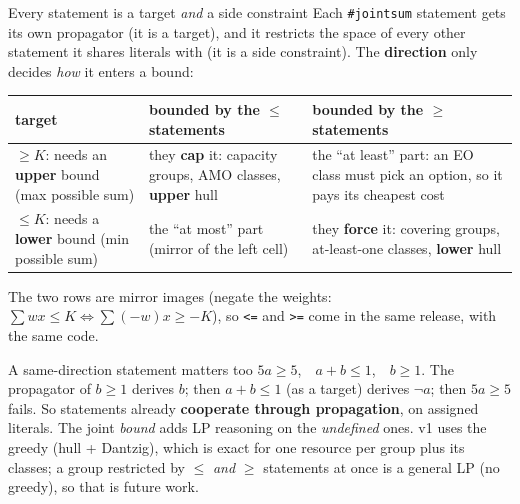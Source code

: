 \documentclass[aspectratio=169,11pt]{beamer}
\begin{document}
\begin{frame}{Every statement is a target \emph{and} a side constraint}
\scriptsize
Each \texttt{\#jointsum} statement gets its own propagator (it is a target), and it restricts the space of every other
statement it shares literals with (it is a side constraint). The \textbf{direction} only decides \emph{how} it enters a bound:
\begin{center}
\begin{tabular}{>{\raggedright\arraybackslash}p{34mm}>{\raggedright\arraybackslash}p{52mm}>{\raggedright\arraybackslash}p{52mm}}\toprule
target & bounded by the $\le$ statements & bounded by the $\ge$ statements\\\midrule
$\ge K$: needs an \textbf{upper} bound (max possible sum)
  & they \textbf{cap} it: capacity groups, AMO classes, \textbf{upper} hull
  & the ``at least'' part: an EO class must pick an option, so it pays its cheapest cost\\
$\le K$: needs a \textbf{lower} bound (min possible sum)
  & the ``at most'' part (mirror of the left cell)
  & they \textbf{force} it: covering groups, at-least-one classes, \textbf{lower} hull\\\bottomrule
\end{tabular}
\end{center}
The two rows are mirror images (negate the weights: $\sum w x \le K \iff \sum (-w) x \ge -K$), so \texttt{<=} and \texttt{>=}
come in the same release, with the same code.
\vspace{1mm}
\begin{block}{A same-direction statement matters too}
$5a \ge 5$,\ \ $a + b \le 1$,\ \ $b \ge 1$. The propagator of $b \ge 1$ derives $b$; then $a+b\le 1$ (as a target) derives $\neg a$;
then $5a \ge 5$ fails. So statements already \textbf{cooperate through propagation}, on assigned literals.
The joint \emph{bound} adds LP reasoning on the \emph{undefined} ones. v1 uses the greedy (hull + Dantzig), which is exact for
one resource per group plus its classes; a group restricted by $\le$ \emph{and} $\ge$ statements at once is a general LP (no
greedy), so that is future work.
\end{block}
\end{frame}
\end{document}

